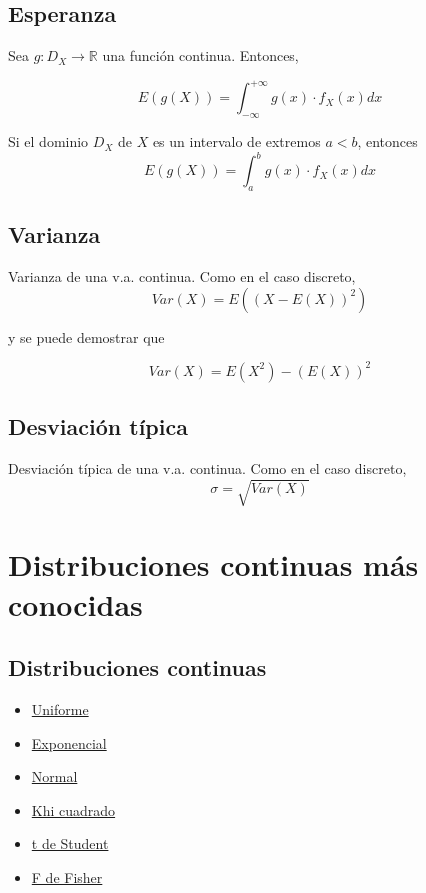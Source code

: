 \documentclass[
]{article}
\providecommand{\tightlist}{%
  \setlength{\itemsep}{0pt}\setlength{\parskip}{0pt}}
\begin{document}
\hypertarget{esperanza-2}{%
\subsection{Esperanza}\label{esperanza-2}}

Sea \(g:D_X\longrightarrow \mathbb{R}\) una función continua. Entonces,

\[E(g(X)) = \int_{-\infty}^{+\infty}g(x)\cdot f_X(x)dx\]

Si el dominio \(D_X\) de \(X\) es un intervalo de extremos \(a<b\),
entonces \[E(g(X))=\int_a^b g(x)\cdot f_X(x)dx\]

\hypertarget{varianza-1}{%
\subsection{Varianza}\label{varianza-1}}

Varianza de una v.a. continua. Como en el caso discreto,
\[Var(X)=E((X-E(X))^2)\]

y se puede demostrar que

\[Var(X)=E(X^2)-(E(X))^2\]

\hypertarget{desviaciuxf3n-tuxedpica-1}{%
\subsection{Desviación típica}\label{desviaciuxf3n-tuxedpica-1}}

Desviación típica de una v.a. continua. Como en el caso discreto,
\[\sigma = \sqrt{Var(X)}\]

\hypertarget{distribuciones-continuas-muxe1s-conocidas}{%
\section{Distribuciones continuas más
conocidas}\label{distribuciones-continuas-muxe1s-conocidas}}

\hypertarget{distribuciones-continuas}{%
\subsection{Distribuciones continuas}\label{distribuciones-continuas}}

\begin{itemize}
\tightlist
\item
  \href{https://es.wikipedia.org/wiki/Distribución_uniforme_continua}{Uniforme}
\item
  \href{https://es.wikipedia.org/wiki/Distribución_exponencial}{Exponencial}
\item
  \href{https://es.wikipedia.org/wiki/Distribución_normal}{Normal}
\item
  \href{https://es.wikipedia.org/wiki/Distribución_χ²}{Khi cuadrado}
\item
  \href{https://es.wikipedia.org/wiki/Distribución_t_de_Student}{t de
  Student}
\item
  \href{https://es.wikipedia.org/wiki/Distribución_F}{F de Fisher}
\end{itemize}
\end{document}
